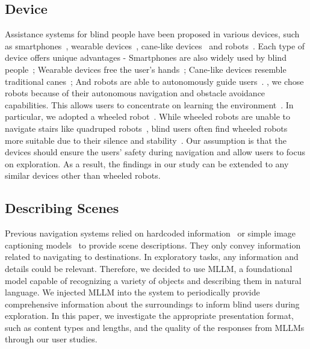 \subsection{Device}
Assistance systems for blind people have been proposed in various devices, such as smartphones~\cite{presti2019watchout},  wearable devices~\cite{li2016isana}, cane-like devices~\cite{ranganeni2023exploring} and robots~\cite{liu2024dragon}.
Each type of device offers unique advantages - Smartphones  are also widely used by blind people~\cite{morris2014blind,martiniello2022exploring}; Wearable devices free the user's hands~\cite{lee2014wearable}; Cane-like devices resemble traditional canes~\cite{ranganeni2023exploring}; And robots are able to autonomously guide users~\cite{guerreiro2019cabot}.
, we chose robots because of their autonomous navigation and obstacle avoidance capabilities. 
This allows users to concentrate on learning the environment~\cite{cai2024navigating,zhang2023follower,jain2023want}. 
In particular, we adopted a wheeled robot~\cite{guerreiro2019cabot,zhang2023follower,wang2022can}.
While wheeled robots are unable to navigate stairs like quadruped robots~\cite{cai2024navigating}, blind users often find wheeled robots more suitable due to their silence and stability~\cite{wang2022can}.
Our assumption is that the devices should ensure the users' safety during navigation and allow users to focus on exploration. 
As a result, the findings in our study can be extended to any similar devices other than wheeled robots. 

\subsection{Describing Scenes}
Previous navigation systems relied on hardcoded information~\cite{sato2019navcog3,Kaniwa2024ChitChatGuide} or simple image captioning models~\cite{saha2019closing} to provide scene descriptions. 
They only convey information related to navigating to destinations. 
In exploratory tasks, any information and details could be relevant. 
Therefore, we decided to use MLLM, a foundational model capable of recognizing a variety of objects and describing them in natural language. 
We injected MLLM into the system to periodically provide comprehensive information about the surroundings to inform blind users during exploration. 
In this paper, we investigate the appropriate presentation format, such as content types and lengths, and the quality of the responses from MLLMs through our user studies.

